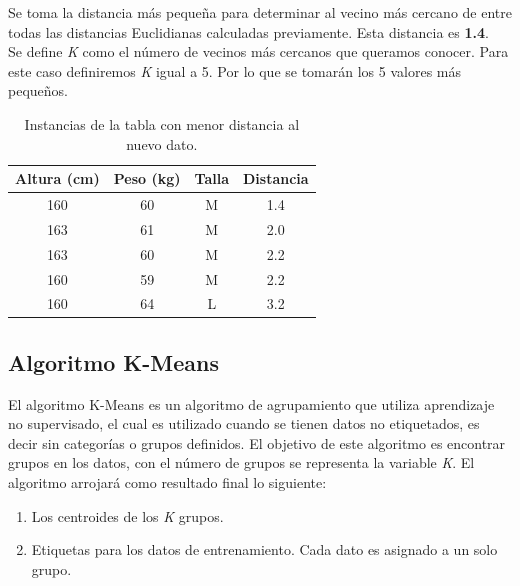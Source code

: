 \begin{UClist}
	\UCli Se toma la distancia más pequeña para determinar al vecino más cercano de entre todas las distancias Euclidianas calculadas previamente. Esta distancia es \textbf{1.4}.\\

	\UCli Se define \emph{K} como el número de vecinos más cercanos que queramos conocer. Para este caso definiremos \emph{K} igual a 5. Por lo que se tomarán los 5 valores más pequeños.\\

	\begin{table}[H]
		\begin{center}
			\label{tab:tablaKNNDistanciasMinimas}
			\begin{tabular}{c|c|c|c}
				\textbf{Altura (cm)} & \textbf{Peso (kg)} & \textbf{Talla} & \textbf{Distancia}\\
				\hline
				160 & 60 & M & 1.4\\
				163 & 61 & M & 2.0\\
				163 & 60 & M & 2.2\\
				160 & 59 & M & 2.2\\
				160 & 64 & L & 3.2\\
			\end{tabular}
		\end{center}
		\caption{Instancias de la tabla con menor distancia al nuevo dato.}
	\end{table}

\end{UClist}

\subsection{Algoritmo K-Means}
El algoritmo K-Means es un algoritmo de agrupamiento que utiliza aprendizaje no supervisado, el cual es utilizado cuando se tienen datos no etiquetados, es decir sin categorías o grupos definidos. El objetivo de este algoritmo es encontrar grupos en los datos, con el número de grupos se representa la variable \emph{K}. El algoritmo arrojará como resultado final lo siguiente:\\

\begin{enumerate}
	\item Los centroides de los \emph{K} grupos.\\
	\item Etiquetas para los datos de entrenamiento. Cada dato es asignado a un solo grupo.\\
\end{enumerate}

